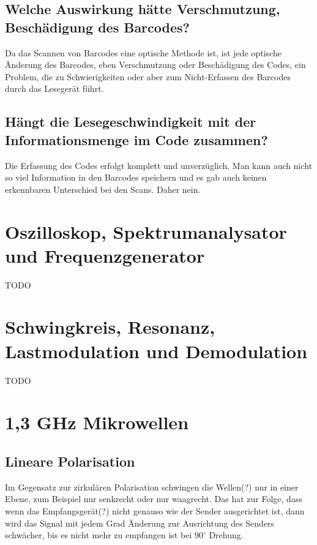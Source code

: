 \documentclass[a4paper,11pt,headsepline,footsepline,parskip=half]{scrartcl}
\begin{document}
\subsection{Welche Auswirkung hätte Verschmutzung, Beschädigung des Barcodes?}

Da das Scannen von Barcodes eine optische Methode ist, ist jede optische Änderung des Barcodes, eben Verschmutzung oder Beschädigung des
Codes, ein Problem, die zu Schwierigkeiten oder aber zum Nicht-Erfassen des Barcodes durch das Lesegerät führt.

\subsection{Hängt die Lesegeschwindigkeit mit der Informationsmenge im Code zusammen?}

Die Erfassung des Codes erfolgt komplett und unverzüglich. Man kann auch nicht so viel Information in den Barcodes
speichern und es gab auch keinen erkennbaren Unterschied bei den Scans. Daher nein.

\section{Oszilloskop, Spektrumanalysator und Frequenzgenerator}

TODO

\section{Schwingkreis, Resonanz, Lastmodulation und Demodulation}

TODO

\section{1,3 GHz Mikrowellen}

\subsection{Lineare Polarisation}

Im Gegensatz zur zirkulären Polarisation schwingen die Wellen(?) nur in einer Ebene, zum Beispiel nur senkrecht oder nur waagrecht.
Das hat zur Folge, dass wenn das Empfangsgerät(?) nicht genauso wie der Sender ausgerichtet ist, dann wird das Signal mit jedem Grad Änderung
zur Ausrichtung des Senders schwächer, bis es nicht mehr zu empfangen ist bei $90^\circ$ Drehung.
\end{document}
